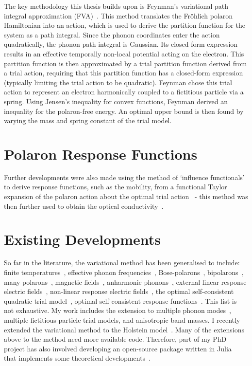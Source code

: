The key methodology this thesis builds upon is Feynman’s variational path integral approximation (FVA)~\cite{feynman_slow_1955}. This method translates the Fr\"ohlich polaron Hamiltonian into an action, which is used to derive the partition function for the system as a path integral. Since the phonon coordinates enter the action quadratically, the phonon path integral is Gaussian. Its closed-form expression results in an effective temporally non-local potential acting on the electron. This partition function is then approximated by a trial partition function derived from a trial action, requiring that this partition function has a closed-form expression (typically limiting the trial action to be quadratic). Feynman chose this trial action to represent an electron harmonically coupled to a fictitious particle via a spring. Using Jensen’s inequality for convex functions, Feynman derived an inequality for the polaron-free energy. An optimal upper bound is then found by varying the mass and spring constant of the trial model. 

\section{Polaron Response Functions}
\label{sec:1-3}

Further developments were also made using the method of ‘influence functionals’ to derive response functions, such as the mobility, from a functional Taylor expansion of the polaron action about the optimal trial action~\cite{feynman_mobility_1962} - this method was then further used to obtain the optical conductivity~\cite{devreese_optical_1972}.

\section{Existing Developments}
\label{sec:1-4}

So far in the literature, the variational method has been generalised to include: finite temperatures~\cite{osaka_polaron_1959}, effective phonon frequencies~\cite{hellwarth_mobility_1999}, Bose-polarons~\cite{ichmoukhamedov_general_2022}, bipolarons~\cite{verbist_extended_1992}, many-polarons~\cite{devreese_many-body_2010}, magnetic fields~\cite{peeters_theory_1984}, anharmonic phonons~\cite{houtput_beyond_2021}, external linear-response electric fields~\cite{feynman_mobility_1962}, non-linear response electric fields~\cite{thornber_velocity_1970}, the optimal self-consistent quadratic trial model~\cite{adamowski_feynmans_1980, adamowski_general_1984}, optimal self-consistent response functions~\cite{thornber_linear_1971}. This list is not exhaustive. My work includes the extension to multiple phonon modes~\cite{martin_multiple_2023}, multiple fictitious particle trial models, and anisotropic band masses. I recently extended the variational method to the Holstein model~\cite{martin_predicting_2024}. Many of the extensions above to the method need more available code. Therefore, part of my PhD project has also involved developing an open-source package written in Julia~\cite{bezanson_julia_2017} that implements some theoretical developments~\cite{frost_jarvistpolaronmobilityjl_2023}.


